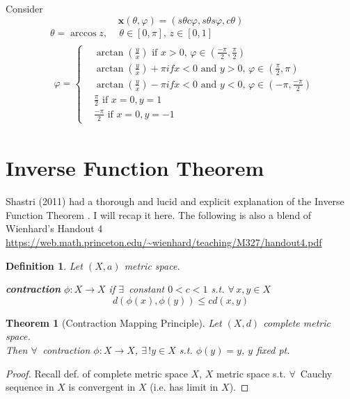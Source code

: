 \documentclass[10pt]{amsart}
\newtheorem{theorem}{Theorem}
\newtheorem{definition}{Definition}
\begin{document}
\begin{multicols*}{2}
Consider 
\[
\mathbf{x}(\theta, \varphi) = (s\theta c\varphi, s\theta s\varphi, c\theta)
\]
\[
\begin{aligned}
& \theta = \arccos{z}, \quad \, \theta \in [0, \pi] , \, z \in [0,1] \\
& \begin{gathered}
\varphi = \begin{cases}
	& \arctan{ \left( \frac{y}{x} \right) } \text{ if } x > 0, \, \varphi \in ( \frac{-\pi}{2}, \frac{\pi}{2}) \\
	& \arctan{ \left( \frac{y}{x} \right) }  + \pi if x < 0 \text{ and } y > 0, \, \varphi \in (\frac{\pi}{2}, \pi) \\
	& \arctan{ \left( \frac{y}{x} \right) }  - \pi if x < 0 \text{ and } y < 0, \, \varphi \in (-\pi, \frac{-\pi}{2}) \\ 
	& \frac{\pi}{2} \text{ if } x = 0, y = 1\\
	& \frac{-\pi}{2} \text{ if } x= 0 , y = -1
\end{cases}	
\end{gathered}
\end{aligned}
\]


\section{Inverse Function Theorem}

Shastri (2011) had a thorough and lucid and explicit explanation of the Inverse Function Theorem \cite{AShastri2011}.  I will recap it here.  The following is also a blend of Wienhard's Handout 4 \url{https://web.math.princeton.edu/~wienhard/teaching/M327/handout4.pdf}

\begin{definition}
  Let $(X,a)$ metric space.  

\textbf{contraction} $\phi:X \to X$ if $\exists \, $ constant $0<c<1$ s.t. $\forall \, x,y \in X$
\[
d(\phi(x),\phi(y)) \leq cd(x,y)
\]
\end{definition}

\begin{theorem}[Contraction Mapping Principle]
  Let $(X,d)$ complete metric space.  \\
Then $\forall \, $ contraction $\phi:X\to X$, $\exists \, ! y\in X$ s.t. $\phi(y) = y$, $y$ \emph{fixed pt.}
\end{theorem}

\begin{proof}
  Recall def. of complete metric space $X$, $X$ metric space s.t. $\forall \, $ Cauchy sequence in $X$ is convergent in $X$ (i.e. has limit in $X$).  


\end{proof}
\end{multicols*}
\end{document}
